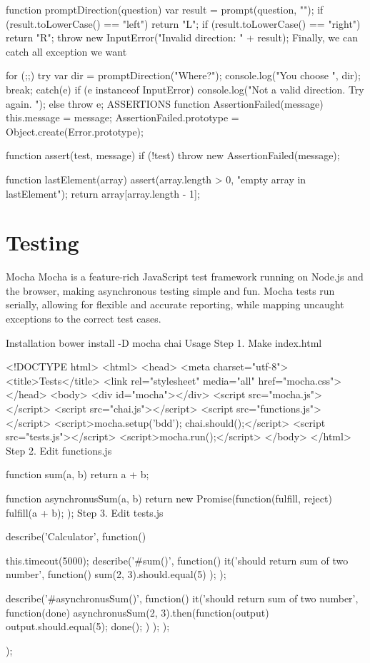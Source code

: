 function promptDirection(question){
  var result = prompt(question, "");
  if (result.toLowerCase() == "left") return "L";
  if (result.toLowerCase() == "right") return "R";
  throw new InputError("Invalid direction: " + result);
}
Finally, we can catch all exception we want

for (;;){
  try {
    var dir = promptDirection("Where?");
    console.log("You choose ", dir);
    break;
  } catch(e) {
    if (e instanceof InputError){
      console.log("Not a valid direction. Try again. ");
    }
    else {
      throw e;
    }
  }
}
ASSERTIONS
function AssertionFailed(message) {
  this.message = message;
}
AssertionFailed.prototype = Object.create(Error.prototype);

function assert(test, message) {
  if (!test)
    throw new AssertionFailed(message);
}

function lastElement(array) {
  assert(array.length > 0, "empty array in lastElement");
  return array[array.length - 1];
}

\section{Testing}

Mocha
Mocha is a feature-rich JavaScript test framework running on Node.js and the browser, making asynchronous testing simple and fun. Mocha tests run serially, allowing for flexible and accurate reporting, while mapping uncaught exceptions to the correct test cases.

Installation
bower install -D mocha chai
Usage
Step 1. Make index.html

<!DOCTYPE html>
<html>
<head>
  <meta charset="utf-8">
  <title>Tests</title>
  <link rel="stylesheet" media="all" href="mocha.css">
</head>
<body>
  <div id="mocha"></div>
  <script src="mocha.js"></script>
  <script src="chai.js"></script>
  <script src="functions.js"></script>
  <script>mocha.setup('bdd'); chai.should();</script>
  <script src="tests.js"></script>
  <script>mocha.run();</script>
</body>
</html>
Step 2. Edit functions.js

function sum(a, b){
  return a + b;
}

function asynchronusSum(a, b){
  return new Promise(function(fulfill, reject){
    fulfill(a + b);
  });
}
Step 3. Edit tests.js

describe('Calculator', function() {
  this.timeout(5000);
  describe('#sum()', function() {
    it('should return sum of two number', function() {
      sum(2, 3).should.equal(5)
    });
  });

  describe('#asynchronusSum()', function() {
    it('should return sum of two number', function(done) {
      asynchronusSum(2, 3).then(function(output){
          output.should.equal(5);
          done();
      })
    });
  });
});

